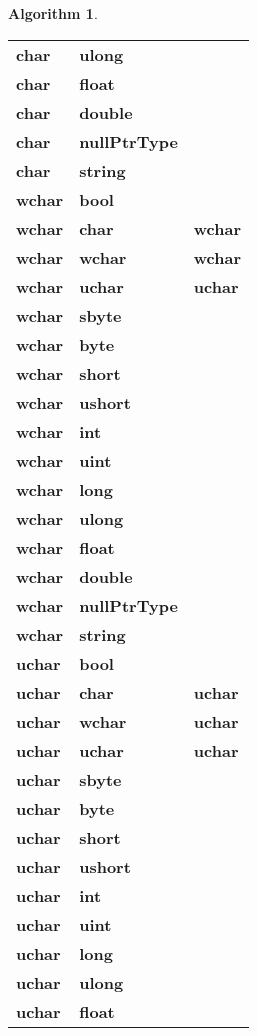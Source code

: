 \documentclass[a4paper,oneside,11pt]{book}
\theoremstyle{definition}
\newtheorem{algo}{Algorithm}[section]
\begin{document}
\begin{algo}
\begin{flushleft}
\begin{supertabular}{lll}
\textbf{char}& \textbf{ulong}& \\
\textbf{char}& \textbf{float}& \\
\textbf{char}& \textbf{double}& \\
\textbf{char}& \textbf{nullPtrType}& \\
\textbf{char}& \textbf{string}& \\
\hline
\textbf{wchar}& \textbf{bool}& \\
\textbf{wchar}& \textbf{char}& \textbf{wchar}\\
\textbf{wchar}& \textbf{wchar}& \textbf{wchar}\\
\textbf{wchar}& \textbf{uchar}& \textbf{uchar}\\
\textbf{wchar}& \textbf{sbyte}& \\
\textbf{wchar}& \textbf{byte}& \\
\textbf{wchar}& \textbf{short}& \\
\textbf{wchar}& \textbf{ushort}& \\
\textbf{wchar}& \textbf{int}& \\
\textbf{wchar}& \textbf{uint}& \\
\textbf{wchar}& \textbf{long}& \\
\textbf{wchar}& \textbf{ulong}& \\
\textbf{wchar}& \textbf{float}& \\
\textbf{wchar}& \textbf{double}& \\
\textbf{wchar}& \textbf{nullPtrType}& \\
\textbf{wchar}& \textbf{string}& \\
\hline
\textbf{uchar}& \textbf{bool}&\\
\textbf{uchar}& \textbf{char}& \textbf{uchar}\\
\textbf{uchar}& \textbf{wchar}& \textbf{uchar}\\
\textbf{uchar}& \textbf{uchar}& \textbf{uchar}\\
\textbf{uchar}& \textbf{sbyte}& \\
\textbf{uchar}& \textbf{byte}& \\
\textbf{uchar}& \textbf{short}& \\
\textbf{uchar}& \textbf{ushort}& \\
\textbf{uchar}& \textbf{int}& \\
\textbf{uchar}& \textbf{uint}& \\
\textbf{uchar}& \textbf{long}& \\
\textbf{uchar}& \textbf{ulong}& \\
\textbf{uchar}& \textbf{float}& \\

\end{supertabular}
\end{flushleft}
\end{algo}
\end{document}

